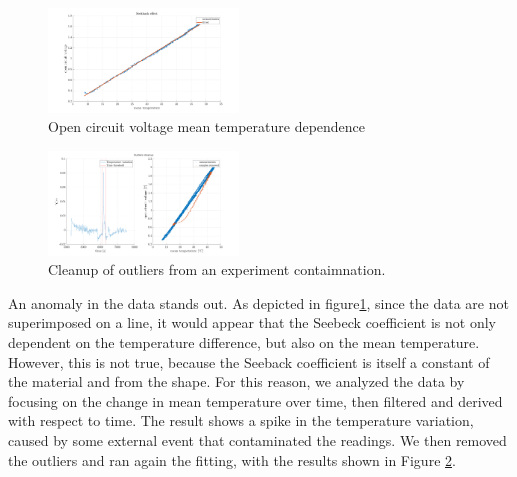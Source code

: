 \begin{figure}[h]
    \centering
    \includegraphics[width=0.45\textwidth]{assets/Seekback effect.png}
    \caption{Open circuit voltage mean temperature dependence}
    \label{fig:voc_dep_t}
\end{figure}
\begin{figure}[h]
    \centering
    \includegraphics[width=0.45\textwidth]{assets/Outliers cleanup.png}
    \caption{Cleanup of outliers from an experiment contaimnation.}
    \label{fig:voc_cleanup}
\end{figure}


An anomaly in the data stands out. As depicted in figure\ref{fig:voc_dep_t}, since the data are not superimposed on a line, it would appear that the Seebeck coefficient is not only dependent on the temperature difference, but also on the mean temperature. However, this is not true, because the Seeback coefficient is itself a constant of the material and from the shape. For this reason, we analyzed the data by focusing on the change in mean temperature over time, then filtered and derived with respect to time. The result shows a spike in the temperature variation, caused by some external event that contaminated the readings. We then removed the outliers and ran again the fitting, with the results shown in Figure \ref{fig:voc_cleanup}.


